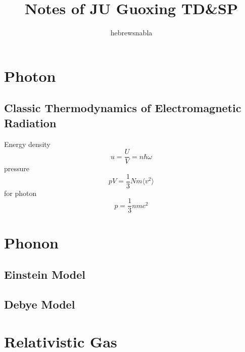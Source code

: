 \documentclass[UTF8]{ctexart} %
\title{Notes of JU Guoxing TD\&SP}
\author{hebrewsnabla}
\numberwithin{equation}{subsection}
\begin{document}
\maketitle
\setcounter{section}{22}
\section{Photon}
\subsection{Classic Thermodynamics of Electromagnetic Radiation}
Energy density
\begin{equation}\label{key}
u = \dfrac{U}{V} = n\hbar\omega
\end{equation}
pressure
\begin{equation}\label{key}
pV = \dfrac{1}{3}Nm\langle v^2\rangle
\end{equation}
for photon
\begin{equation}\label{key}
p = \dfrac{1}{3}nmc^2
\end{equation}

\section{Phonon}
\subsection{Einstein Model}

\subsection{Debye Model}

\section{Relativistic Gas}
\subsection{}
\end{document}
